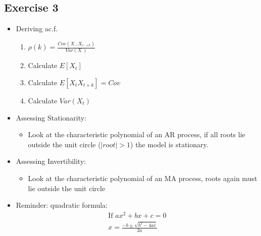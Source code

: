 \subsection{Exercise 3}
\begin{itemize}
    \item Deriving ac.f. 
    \begin{enumerate}
        \item[] $\rho(k)=\frac{Cov(X_\cdot, X_{c\cdot + k})}{Var(X_\cdot)} $
        \item Calculate $E[X_t]$
        \item Calculate $E[X_t X_{t+k}] = Cov$
        \item Calculate $Var(X_t)$
    \end{enumerate}
    \item Assessing Stationarity:
    \begin{itemize}
        \item Look at the characteristic polynomial of an AR process, if all roots lie outside the unit circle ($|root|>1$) the model is stationary.
    \end{itemize}
    \item Assessing Invertibility:
    \begin{itemize}
        \item Look at the characteristic polynomial of an MA process, roots again must lie outside the unit circle
    \end{itemize}
    \item Reminder: quadratic formula:
    \begin{align*}
        \text{If } ax^2 +bx+c=0 \\
        x=\frac{-b \pm \sqrt{b^2-4ac}}{2a}
    \end{align*}
\end{itemize}